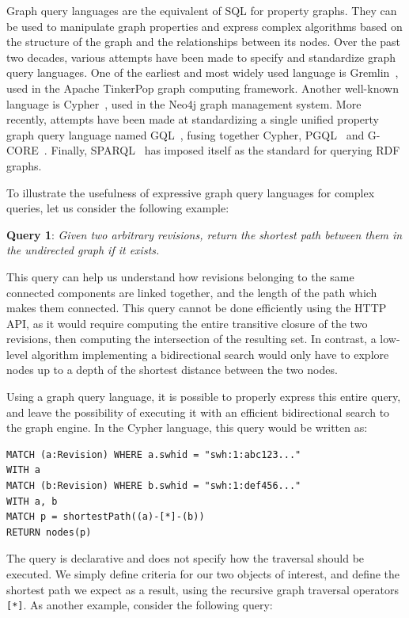Graph query languages are the equivalent of SQL for property graphs. They can
be used to manipulate graph properties and express complex algorithms based on
the structure of the graph and the relationships between its nodes. Over the
past two decades, various attempts have been made to specify and standardize
graph query languages. One of the earliest and most widely used language is
Gremlin~\cite{rodriguez2015gremlin}, used in the Apache TinkerPop graph
computing framework. Another well-known language is
Cypher~\cite{francis2018cypher}, used in the Neo4j graph management system.
More recently, attempts have been made at standardizing a single unified property
graph query language named GQL~\cite{michels2017standardizing}, fusing together
Cypher, PGQL~\cite{van2016pgql} and G-CORE~\cite{angles2018g}. Finally,
SPARQL~\cite{perez2009semantics} has imposed itself as the standard for
querying \gls{RDF} graphs.

To illustrate the usefulness of expressive graph query languages for complex
queries, let us consider the following example:

\textbf{Query 1}: \emph{Given two arbitrary revisions, return the shortest path
between them in the undirected graph if it exists.}

This query can help us understand how revisions belonging to the same connected
components are linked together, and the length of the path which makes them
connected. This query cannot be done efficiently using the HTTP API, as it
would require computing the entire transitive closure of the two revisions,
then computing the intersection of the resulting set. In contrast, a low-level
algorithm implementing a bidirectional search would only have to explore nodes
up to a depth of the shortest distance between the two nodes.

Using a graph query language, it is possible to properly express this entire
query, and leave the possibility of executing it with an efficient
bidirectional search to the graph engine. In the Cypher language, this query
would be written as:

\begin{verbatim}
MATCH (a:Revision) WHERE a.swhid = "swh:1:abc123..."
WITH a
MATCH (b:Revision) WHERE b.swhid = "swh:1:def456..."
WITH a, b
MATCH p = shortestPath((a)-[*]-(b))
RETURN nodes(p)
\end{verbatim}

The query is declarative and does not specify how the traversal should be
executed. We simply define criteria for our two objects of interest, and
define the shortest path we expect as a result, using the recursive graph
traversal operators \texttt{[*]}.
As another example, consider the following query:

